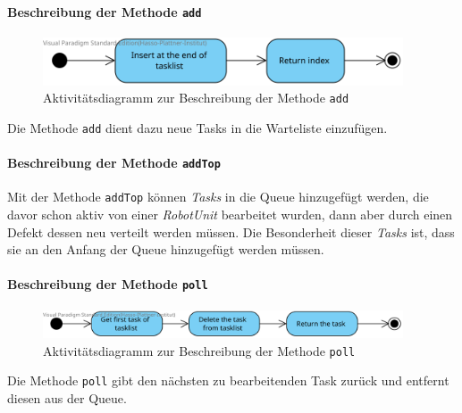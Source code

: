 			\paragraph{Beschreibung der Methode \texttt{add}}		
			\begin{figure}[H]
			\centering
			\includegraphics[width=0.95\textwidth]{img/add}
			\caption{Aktivitätsdiagramm zur Beschreibung der Methode \texttt{add}}
			\label{SequenzQueueAdd}
			\end{figure}
			
			Die Methode \texttt{add} dient dazu neue Tasks in die Warteliste einzufügen.
			
			\paragraph{Beschreibung der Methode \texttt{addTop}}		
			
			Mit der Methode \texttt{addTop} können \textit{Tasks} in die Queue hinzugefügt werden, die davor schon aktiv von einer \textit{RobotUnit} bearbeitet wurden, dann aber durch einen Defekt dessen neu verteilt werden müssen. 
			Die Besonderheit dieser \textit{Tasks} ist, dass sie an den Anfang der Queue hinzugefügt werden müssen.
				
			\paragraph{Beschreibung der Methode \texttt{poll}}		
			\begin{figure}[H]
			\centering
			\includegraphics[width=0.95\textwidth]{img/2-Entwurf-poll}
			\caption{Aktivitätsdiagramm zur Beschreibung der Methode \texttt{poll}}
			\label{SequenzQueuePoll}
			\end{figure}			
			
			Die Methode \texttt{poll} gibt den nächsten zu bearbeitenden Task zurück und entfernt diesen aus der Queue.
				
